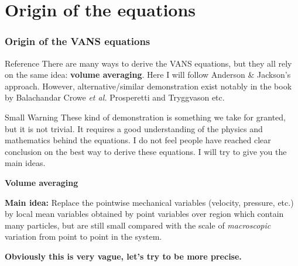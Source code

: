\documentclass[c,11pt,xcolor=dvipsnames, aspectratio=169]{beamer}
\begin{document}
\section{Origin of the equations}

\begin{frame}
\frametitle{\textbf{Origin of the VANS equations}}
\begin{block}{Reference}
There are many ways to derive the VANS equations, but they all rely on the same idea: \textbf{volume averaging}. Here I will follow Anderson \& Jackson's approach. %
 However, alternative/similar demonstration exist notably in the book by Balachandar %
 Crowe \textit{et al.} %
 Prosperetti and Tryggvason %
  etc.
\end{block}

\begin{block}{Small Warning}
These kind of demonstration is something we take for granted, but it is not trivial. It requires a good understanding of the physics and mathematics behind the equations. I do not feel people have reached clear conclusion on the best way to derive these equations. I will try to give you the main ideas.
\end{block}

\end{frame}

\begin{frame}{\textbf{Volume averaging}}

	{\begin{shaded}
\textbf{Main idea:} Replace the pointwise mechanical variables (velocity, pressure, etc.) by local mean variables obtained by point variables over region which contain many particles, but are still small compared with the scale of \textit{macroscopic} variation from point to point in the system.
	\end{shaded}}

\textbf{Obviously this is very vague, let's try to be more precise.}

\end{frame}
\end{document}
